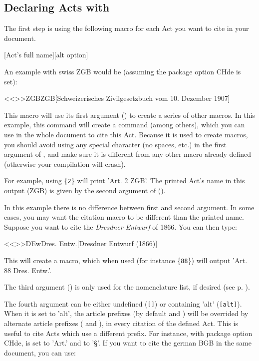 \documentclass[a4paper]{ltxdockit}[2011/03/25]
\newcommand{\marg}[1]{\{\texttt{#1}\}}
\newcommand{\oarg}[1]{\texttt{[#1]}}
\begin{document}
\subsection{Declaring Acts with }

The first step is using the following macro for each Act you want to cite in your document.

\begin{ltxsyntax}
[Act's full name][alt option]
\end{ltxsyntax} 


An example with swiss ZGB would be (assuming the package option CHde is set):

\begin{ltxcode}
<<\DeclareLex>>{ZGB}{ZGB}[Schweizerisches Zivilgesetzbuch vom 10. Dezember 1907]
\end{ltxcode}

This macro will use its first argument () to create a series of other macros. In this example, this command will  create a  command (among others), which you can use in the whole document to cite this Act. 
Because it is used to create macros, you should avoid using any special character (no spaces, etc.) in the first argument of , and make sure it is different from any other macro already defined (otherwise your compilation will crash).

For example, using \marg{2} will print 'Art. 2 ZGB'.
The printed Act's name in this output (ZGB) is given by the second argument of  ().

In this example there is no difference between first and second argument. In some cases, you may want the citation macro to be different than the printed name.  Suppose you want to cite the \textit{Dresdner Entwurf} of 1866. You can then type:

\begin{ltxcode}
<<\DeclareLex>>{DEw}{Dres. Entw.}[Dresdner Entwurf (1866)]
\end{ltxcode}

This will create a  macro, which when used (for instance \marg{88}) will output 'Art. 88 Dres. Entw.'.

The third argument () is only used for the nomenclature list, if desired (see p. \pageref{nomenclature}).

The fourth argument can be either undefined (\oarg{}) or containing 'alt' (\oarg{alt}). When it is set to 'alt', the article prefixes (by default  and ) will be overrided by alternate article prefixes ( and ), in every citation of the defined Act. This is useful to cite Acts which use a different prefix. For instance, with package option CHde,  is set to 'Art.' and  to '\S'. If you want to cite the german BGB in the same document, you can use:
\end{document}
